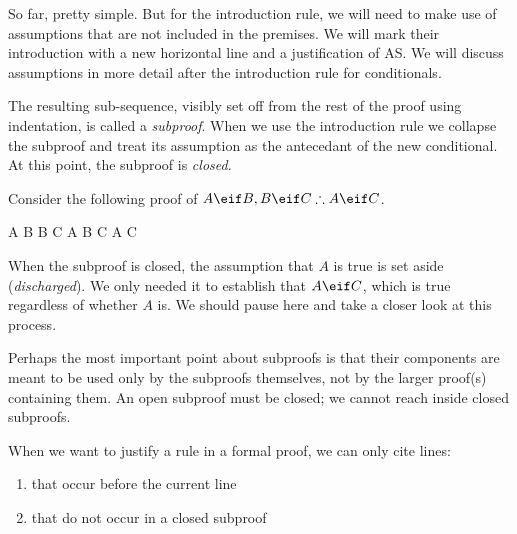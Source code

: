 So far, pretty simple. But for the introduction rule, we will need to make use
of assumptions that are not included in the premises. We will mark their
introduction with a new horizontal line and a justification of AS. We will
discuss assumptions in more detail after the introduction rule for conditionals.

\begin{fitchrule}
  \label{def:if-introduction-rule}
  \leavevmode
  \vspace{-0.9\baselineskip}
  \begin{fitchproof}
    \open
     {\ephi}           
     {\epsi}
    \close
     {\ephi\eif\epsi}  
  \end{fitchproof}
\end{fitchrule}

The resulting sub-sequence, visibly set off from the rest of the proof using
indentation, is called a \emph{subproof}. When we use the \eif introduction rule
we collapse the subproof and treat its assumption as the antecedant of the new
conditional. At this point, the subproof is \emph{closed}.

Consider the following proof of $A\eif B, B \eif C \therefore A \eif C$.

\begin{fitchproof}
   {A \eif B} 
   {B \eif C} 
  \open
   {A}        
   {B}        
   {C}          
  \close
   {A \eif C} 
\end{fitchproof}

When the subproof is closed, the assumption that $A$ is true is set aside
(\emph{discharged}). We only needed it to establish that $A \eif C$, which is
true regardless of whether $A$ is. We should pause here and take a closer look
at this process.

Perhaps the most important point about subproofs is that their components are
meant to be used only by the subproofs themselves, not by the larger proof(s)
containing them. An open subproof must be closed; we cannot reach inside closed
subproofs.

\begin{definition}
  \label{def:permissible-line-citations}
  When we want to justify a rule in a formal proof, we can only cite lines:
  \vspace{-0.9\baselineskip}
  \begin{enumerate}
  \item that occur before the current line
  \item that do not occur in a closed subproof
  \end{enumerate}  
\end{definition}

